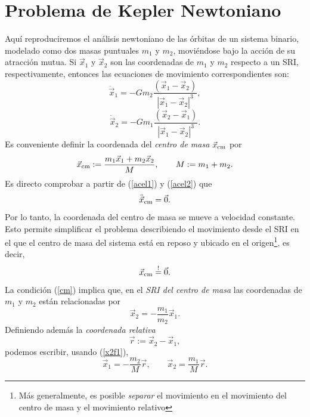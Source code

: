 \chapter{Problema de Kepler Newtoniano}\label{app:Kepler}

Aquí reproduciremos el análisis newtoniano de las órbitas de un sistema binario, modelado como dos masas puntuales $m_1$ y $m_2$, moviéndose bajo la acción de su atracción mutua. Si $\vec{x}_1$ y $\vec{x}_2$ son las coordenadas de $m_1$ y $m_2$ respecto a un SRI, respectivamente, entonces las ecuaciones de movimiento correspondientes son:
\begin{equation}
\ddot{\vec{x}}_1=-Gm_2\frac{(\vec{x}_1-\vec{x}_2)}{|\vec{x}_1-\vec{x}_2|^3} ,\label{acel1}
\end{equation}
\begin{equation}
\ddot{\vec{x}}_2=-Gm_1\frac{(\vec{x}_2-\vec{x}_1)}{|\vec{x}_1-\vec{x}_2|^3} .\label{acel2}
\end{equation}
Es conveniente definir la coordenada del \textit{centro de masa} $\vec{x}_{\rm cm}$ por
\begin{equation}
\vec{x}_{\rm cm}:=\frac{m_1\vec{x}_1+m_2\vec{x}_2}{M}, \qquad M:=m_1+m_2.
\end{equation}
Es directo comprobar a partir de (\ref{acel1}) y (\ref{acel2}) que
\begin{equation}
\ddot{\vec{x}}_{\rm cm}=\vec{0}.
\end{equation}
Por lo tanto, la coordenada del centro de masa se mueve a velocidad constante. Esto permite simplificar el problema describiendo el movimiento desde el SRI en el que el centro de masa del sistema está en reposo y ubicado en el origen\footnote{Más generalmente, es posible \textit{separar} el movimiento en el movimiento del centro de masa y el movimiento relativo}, es decir,
\begin{equation}
\vec{x}_{\rm cm}\stackrel{!}{=}\vec{0}. \label{cm}
\end{equation}
La condición (\ref{cm}) implica que, en el \textit{SRI del centro de masa} las coordenadas de $m_1$ y $m_2$ están relacionadas por
\begin{equation}
\vec{x}_2=-\frac{m_1}{m_2}\vec{x}_1. \label{x2f1}
\end{equation}
Definiendo además la \textit{coordenada relativa}
\begin{equation}
\vec{r}:=\vec{x}_2-\vec{x}_1,
\end{equation}
podemos escribir, usando (\ref{x2f1}),
\begin{equation}\label{x12fr}
\vec{x}_1=-\frac{m_2}{M}\vec{r}, \qquad \vec{x}_2=\frac{m_1}{M}\vec{r}.
\end{equation}
